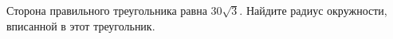 \begin{ex}
	\begin{condition}
		Сторона правильного треугольника равна \( 30\sqrt{3} \). Найдите радиус окружности, вписанной в этот треугольник.
	\end{condition}
\end{ex}